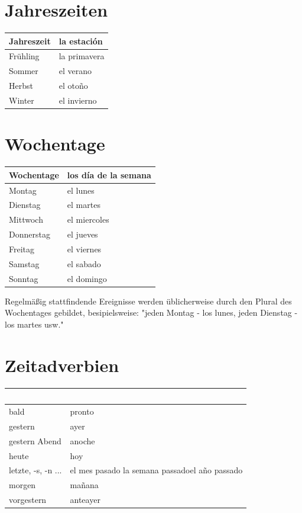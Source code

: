 \documentclass{spanish_summary}
\begin{document}
\section*{Jahreszeiten}
\begin{longtable}{p{} | p{}} 
\textbf{Jahreszeit}     & \textbf{la estación}                                       \\ \hline
\hline
\endhead %
Frühling & la primavera \\
Sommer & el verano \\
Herbst & el oto\~{n}o \\
Winter & el invierno \\
\end{longtable}

\newpage

\section*{Wochentage}
\begin{longtable}{p{} | p{}} 
\textbf{Wochentage}     & \textbf{los día de la semana}                                       \\ \hline
\hline
\endhead %
Montag & el lunes \\
Dienstag & el martes\\
Mittwoch & el miercoles \\
Donnerstag & el jueves \\
Freitag & el viernes\\
Samstag & el sabado \\
Sonntag & el domingo \\
\end{longtable}
Regelmäßig stattfindende Ereignisse werden üblicherweise durch den Plural des Wochentages gebildet, besipielsweise: "jeden Montag - los lunes, jeden Dienstag - los martes usw."

\section*{Zeitadverbien}
\begin{longtable}{p{} | p{}} 
\textbf{~}     & \textbf{~}                                       \\ \hline
bald & pronto\\
gestern & ayer\\
gestern Abend & anoche\\
heute & hoy\\
letzte, -s, -n ... & el mes pasado \newline la semana passado\newline el a\~{n}o passado\\
morgen & ma\~{n}ana\\
vorgestern & anteayer
\end{longtable}
\end{document}
